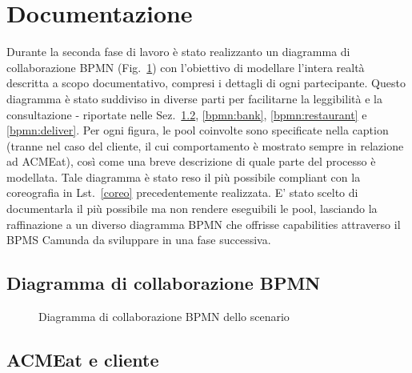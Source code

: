 \documentclass[11pt]{article} %
\begin{document}
\clearpage

\section{Documentazione}
\label{sez:documentazione}

Durante la seconda fase di lavoro è stato realizzanto un diagramma di collaborazione BPMN (Fig.~\ref{bpmn}) con l'obiettivo di modellare l'intera realtà descritta a scopo documentativo, compresi i dettagli di ogni partecipante. Questo diagramma è stato suddiviso in diverse parti per facilitarne la leggibilità e la consultazione - riportate nelle Sez.~\ref{bpmn:acmeat}, \ref{bpmn:bank}, \ref{bpmn:restaurant} e \ref{bpmn:deliver}. Per ogni figura, le pool coinvolte sono specificate nella caption (tranne nel caso del cliente, il cui comportamento è mostrato sempre in relazione ad ACMEat), così come una breve descrizione di quale parte del processo è modellata. Tale diagramma è stato reso il più possibile compliant con la coreografia in Lst.~\ref{coreo} precedentemente realizzata. E' stato scelto di documentarla il più possibile ma non rendere eseguibili le pool, lasciando la raffinazione a un diverso diagramma BPMN che offrisse capabilities attraverso il BPMS Camunda da sviluppare in una fase successiva.

\subsection{Diagramma di collaborazione BPMN}

\begin{figure}[H]
\caption{Diagramma di collaborazione BPMN dello scenario}
\label{bpmn}
\end{figure}

\clearpage

\subsection{ACMEat e cliente}
\label{bpmn:acmeat}
\end{document}
